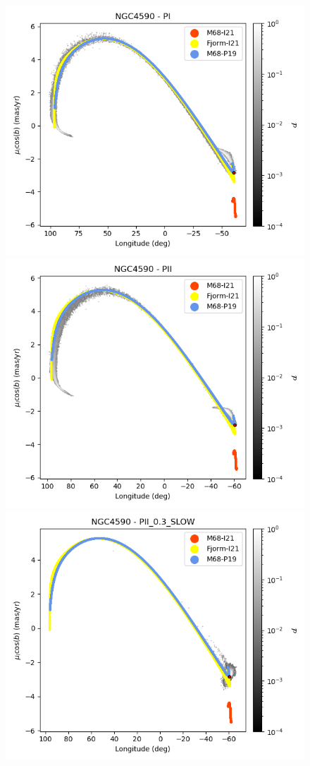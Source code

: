\begin{figure}
\begin{center}
                    \includegraphics[clip=true, trim = 0mm 0mm 0mm 0mm, width=0.65\columnwidth]{images/PI_individual_NGC4590_galstream-NGC4590-l-pm_l_cosb.png}
                    \includegraphics[clip=true, trim = 0mm 0mm 0mm 0mm, width=0.65\columnwidth]{images/PII_individual_NGC4590_galstream-NGC4590-l-pm_l_cosb.png}
                    \includegraphics[clip=true, trim = 0mm 0mm 0mm 0mm, width=0.65\columnwidth]{images/PII_0.3_SLOW_individual_NGC4590_galstream-NGC4590-l-pm_l_cosb.png}
                        

\end{center}
\end{figure}
